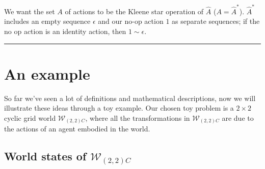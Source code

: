 {\begin{compactitem}
    \item We want the set $A$ of actions to be the Kleene star operation of $\hat{A}$ ($A = \hat{A}^{\ast}$). $\hat{A}^{\ast}$ includes an empty sequence $\epsilon$ and our no-op action $1$ as separate sequences; if the no op action is an identity action, then $1 \sim \epsilon$.
\end{compactitem}
\noindent\rule{\textwidth}{1mm}
}

\section{An example}

So far we've seen a lot of definitions and mathematical descriptions, now we will illustrate these ideas through a toy example.
Our chosen toy problem is a $2\times 2$ cyclic grid world $\mathscr{W}_{(2,2)C}$, where all the transformations in $\mathscr{W}_{(2,2)C}$ are due to the actions of an agent embodied in the world.

\subsection{World states of $\mathscr{W}_{(2,2)C}$}\label{sec:World states of example}

